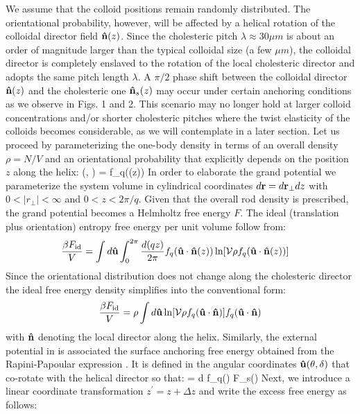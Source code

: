  We assume that the colloid positions remain randomly distributed. The orientational probability, however, will be affected by a helical rotation of  the  colloidal director field ${\bf \hat{n}}(z)$. Since the cholesteric pitch $\lambda \approx 30 \mu m$ is about an order of magnitude larger than the typical colloidal size (a few $\mu m$), the colloidal director is completely enslaved to the rotation of the local cholesteric director and adopts the same pitch length $\lambda$. A $\pi/2$ phase shift between the colloidal director ${\bf \hat{n}}(z)$ and the cholesteric one ${\bf \hat{n}}_{s}(z)$ may occur under certain anchoring conditions as we observe in Figs. 1 and 2.  This scenario may no longer hold at larger colloid concentrations and/or shorter cholesteric pitches where the twist elasticity of the colloids becomes considerable, as we will contemplate in a later section. Let us proceed by parameterizing the one-body density in terms of an overall density $\rho = N/V$ and an orientational probability that explicitly depends on the position $z$ along the helix:
 \beq
  \rho(\bfr, \bhu) = \rho f_{q}(\bhu \cdot \bn(z))
 \eeq
 In order to elaborate the grand potential we parameterize the system volume in cylindrical coordinates $d {\bf r}  = d {\bf r}_{\perp} dz$ with $0< |r_{\perp}| < \infty$ and $0< z < 2 \pi/q$. Given that the overall rod density is prescribed, the grand potential becomes a Helmholtz free energy $F$. The ideal (translation plus orientation) entropy  free energy per unit volume follow from:
  \begin{align}
 & \frac{ \beta F_{\rm id}}{ V} =  \int d {\bf \hat{u}} \int_{0}^{2\pi}  \frac{d(qz)}{2 \pi} f_{q}( {\bf \hat{u}} \cdot {\bf \hat{n}}(z))  \ln [{\mathcal V} \rho  f_{q}( {\bf \hat{u}} \cdot {\bf \hat{n}}(z))]
 \end{align}
Since the orientational distribution does not change along the cholesteric director the ideal free energy density simplifies into the conventional form:
 \begin{align}
  \frac{ \beta F_{\rm id}}{ V} =  \rho \int d {\bf \hat{u}} \ln [{\mathcal V} \rho  f_{q}( {\bf \hat{u}} \cdot {\bf \hat{n}})] f_{q}( {\bf \hat{u}} \cdot {\bf \hat{n}})
 \end{align}
 with ${\bf \hat{n}}$ denoting the local director along the helix. Similarly, the external potential in  is associated the surface anchoring free energy obtained from the Rapini-Papoular expression . It is  defined in the angular coordinates ${\bf \hat{u}}(\theta, \delta)$ that co-rotate with the helical director so that:
\beq
{} = \rho \int d \bhu   f_{q}(\bhu \cdot \bn)  F_{s}(\bhu)
\eeq
Next, we introduce a linear coordinate transformation $z^{\prime} = z + \Delta z$ and write the excess free energy as follows:
